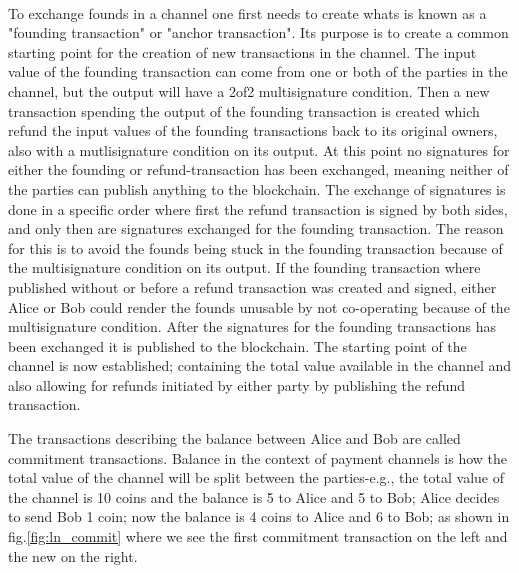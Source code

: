 \paragraph{}
To exchange founds in a channel one first needs to create whats is known as a "founding transaction" or "anchor transaction". Its purpose is to create a common starting point for the creation of new transactions in the channel. The input value of the founding transaction can come from one or both of the parties in the channel, but the output will have a 2of2 multisignature condition. Then a new transaction spending the output of the founding transaction is created which refund the input values of the founding transactions back to its original owners, also with a mutlisignature condition on its output. At this point no signatures for either the founding or refund-transaction has been exchanged, meaning neither of the parties can publish anything to the blockchain. The exchange of signatures is done in a specific order where first the refund transaction is signed by both sides, and only then are signatures exchanged for the founding transaction. The reason for this is to avoid the founds being stuck in the founding transaction because of the multisignature condition on its output. If the founding transaction where published without or before a refund transaction was created and signed, either Alice or Bob could render the founds unusable by not co-operating because of the multisignature condition. After the signatures for the founding transactions has been exchanged it is published to the blockchain. The starting point of the channel is now established; containing the total value available in the channel and also allowing for refunds initiated by either party by publishing the refund transaction.

The transactions describing the balance between Alice and Bob are called commitment transactions. Balance in the context of payment channels is how the total value of the channel will be split between the parties-e.g., the total value of the channel is 10 coins and the balance is 5 to Alice and 5 to Bob; Alice decides to send Bob 1 coin; now the balance is 4 coins to Alice and 6 to Bob; as shown in fig.\ref{fig:ln_commit} where we see the first commitment transaction on the left and the new on the right.

